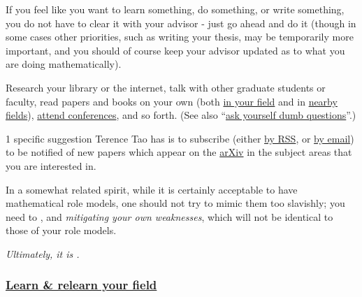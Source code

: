 \documentclass{article}
\begin{document}
%
If you feel like you want to learn something, do something, or write something, you do not have to clear it with your advisor - just go ahead and do it (though in some cases other priorities, such as writing your thesis, may be temporarily more important, and you should of course keep your advisor updated as to what you are doing mathematically).

Research your library or the internet, talk with other graduate students or faculty, read papers and books on your own (both \href{https://terrytao.wordpress.com/career-advice/learn-and-relearn-your-field/}{in your field} and in \href{https://terrytao.wordpress.com/career-advice/don't-be-afraid-to-learn-things-outside-your-field/}{nearby fields}), \href{https://terrytao.wordpress.com/career-advice/attend-talks-and-conferences-even-those-not-directly-related-to-your-work/}{attend conferences}, and so forth. (See also ``\href{https://terrytao.wordpress.com/career-advice/ask-yourself-dumb-questions-and-answer-them/}{ask yourself dumb questions}''.)

%
1 specific suggestion Terence Tao has is to subscribe (either \href{http://www.arxiv.org/help/rss}{by RSS}, or \href{http://arxiv.org/help/subscribe}{by email}) to be notified of new papers which appear on the \href{http://www.arxiv.org/}{arXiv} in the subject areas that you are interested in.

%
In a somewhat related spirit, while it is certainly acceptable to have mathematical role models, one should not try to mimic them too slavishly; you need to ,  and \textit{mitigating your own weaknesses}, which will not be identical to those of your role models.

\textit{Ultimately, it is .}

\subsubsection{\href{https://terrytao.wordpress.com/career-advice/learn-and-relearn-your-field/}{Learn \& relearn your field}}
\end{document}
